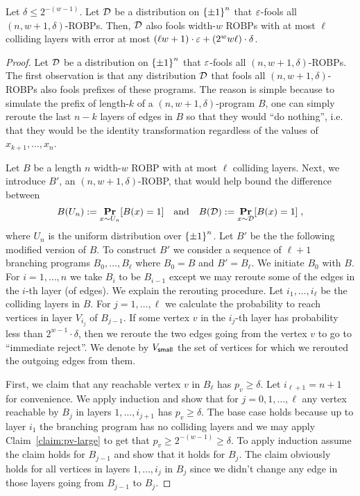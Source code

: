 \begin{lemma}\label{lemma:negligible}
Let $\delta \le 2^{-(w-1)}$.
Let ${\mathcal{D}}$ be a distribution on ${\{\pm1\}}^n$ that $\varepsilon$-fools all $(n,w+1,\delta)$-ROBPs.
Then, ${\mathcal{D}}$ also fools width-$w$ ROBPs with at most $\ell$ colliding layers with error at most $(\ell w +1)\cdot \varepsilon +  (2^{w} w \ell) \cdot \delta$.
\end{lemma}
\begin{proof}
	Let ${\mathcal{D}}$ be a distribution on ${\{\pm1\}}^n$ that $\varepsilon$-fools all $(n,w+1,\delta)$-ROBPs.
The first observation is that any distribution ${\mathcal{D}}$ that fools all $(n,w+1,\delta)$-ROBPs also fools prefixes of these programs. The reason is simple because to simulate the prefix of length-$k$ of a $(n,w+1,\delta)$-program $B$, one can simply reroute the last $n-k$ layers of edges in $B$ so that they would ``do nothing'', i.e. that they would be the identity transformation regardless of the values of $x_{k+1}, \ldots, x_n$.

Let $B$ be a length $n$ width-$w$ ROBP with at most $\ell$ colliding layers.
Next, we introduce $B'$, an $(n,w+1,\delta)$-ROBP, that would help bound the difference between 
$$
B(U_n) := \mathop{\bf Pr\/}_{x\sim U_n} [B(x)=1] \quad\text{and}\quad 
B({\mathcal{D}}) := \mathop{\bf Pr\/}_{x\sim {\mathcal{D}}} [B(x)=1]\;,
$$ 
where $U_n$ is the uniform distribution over ${\{\pm1\}}^n$.
Let $B'$ be the the following modified version of $B$.
To construct $B'$ we consider a sequence of $\ell+1$ branching programs $B_0, \ldots, B_\ell$ where $B_0 = B$ and $B' = B_\ell$.
We initiate $B_0$ with $B$.
For $i=1, \ldots, n$ we take $B_i$ to be $B_{i-1}$ except we may reroute some of the edges in the $i$-th layer (of edges).
We explain the rerouting procedure. Let $i_1, \ldots, i_\ell$ be the colliding layers in $B$.
For $j=1,\ldots, \ell$ we calculate the probability to reach vertices in layer $V_{i_j}$ of $B_{j-1}$. If some vertex $v$ in the $i_j$-th layer has probability less than $2^{w-1} \cdot \delta$, then we reroute the two edges going from the vertex $v$ to go to ``immediate reject''. We denote by $V_{\mathsf{small}}$ the set of vertices for which we rerouted the outgoing edges from them.

First, we claim that any reachable vertex $v$ in $B_\ell$ has $p_v  \ge \delta$. 
Let $i_{\ell+1} = n+1$ for convenience. 
We apply induction and show that for $j=0,1, \ldots, \ell$ any vertex reachable by $B_{j}$ in layers $1,\ldots, i_{j+1}$ has $p_v \ge \delta$.
The base case holds because up to layer $i_{1}$ the branching program has no colliding layers and we may apply Claim~\ref{claim:pv-large} to get that $p_v \ge 2^{-(w-1)} \ge \delta$.
To apply induction assume the claim holds for $B_{j-1}$ and show that it holds for $B_{j}$.
The claim obviously holds for all vertices in layers $1, \ldots, i_{j}$ in $B_j$ since we didn't change any edge in those layers going from  $B_{j-1}$ to $B_j$.


\end{proof}
